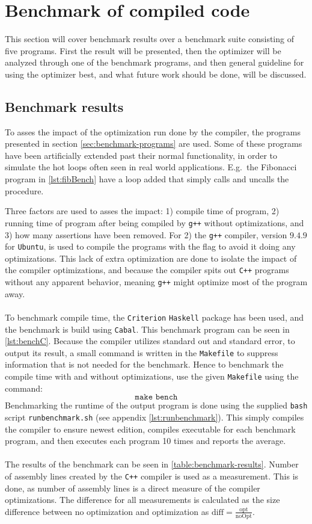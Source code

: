 \section{Benchmark of compiled code}
This section will cover benchmark results over a benchmark suite consisting of five \lan
programs. First the result will be presented, then the optimizer will be analyzed through
one of the benchmark programs, and then general guideline for using the optimizer best, and
what future work should be done, will be discussed.

\subsection{Benchmark results}
To asses the impact of the optimization run done by the \lan compiler, the programs
presented in section \ref{sec:benchmark-programs} are used. Some of these programs have been
artificially extended past their normal functionality, in order to simulate the hot loops 
often seen in real world applications. E.g.\ the Fibonacci program in \autoref{lst:fibBench}
have a loop added that simply calls and uncalls the  procedure.

Three factors are used to asses the impact: 1) compile time of program, 2) running time of program
after being compiled by \texttt{g++} without optimizations, and 3) how many assertions have been
removed. For 2) the \texttt{g++} compiler, version $9.4.9$ for \texttt{Ubuntu}, is used to compile
the programs with the flag  to avoid it doing any optimizations. This lack of extra
optimization are done to isolate the impact of the \lan compiler optimizations, and because
the \lan compiler spits out \texttt{C++} programs without any apparent behavior, meaning
\texttt{g++} might optimize most of the program away.
\\
\\
To benchmark compile time, the \texttt{Criterion} \texttt{Haskell} package has been used,
and the benchmark is build using \texttt{Cabal}. This benchmark program can be seen in
\autoref{lst:benchC}. Because the \lan compiler utilizes
standard out and standard error, to output its result, a small command is written in the
\texttt{Makefile} to suppress information that is not needed for the benchmark. Hence
to benchmark the compile time with and without optimizations, use the given
\texttt{Makefile} using the command:
$$\texttt{make bench}$$
\noindent
Benchmarking the runtime of the output program is done using the supplied \texttt{bash}
script \texttt{runbenchmark.sh} (see appendix \ref{lst:runbenchmark}). This simply compiles
the \lan compiler to ensure newest edition, compiles executable for each benchmark program,
and then executes each program 10 times and reports the average.
\\
\\
The results of the benchmark can be seen in \autoref{table:benchmark-results}.
Number of assembly lines created by the \texttt{C++} compiler is used as a measurement.
This is done, as number of assembly lines is a
direct measure of the \lan compiler optimizations. 
The difference for all measurements is calculated as the size difference between no optimization
and optimization as $\text{diff} = \frac{\text{opt}}{\text{noOpt}}$.

